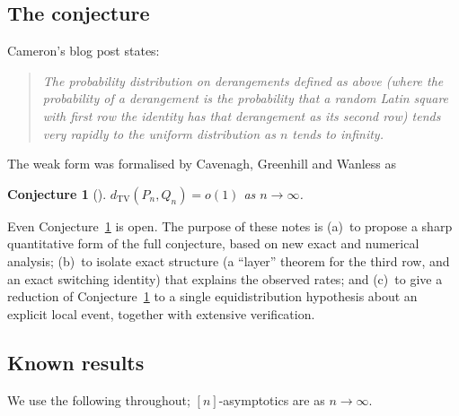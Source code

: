 \documentclass[11pt]{article}
\newtheorem{conjecture}[theorem]{Conjecture}
\theoremstyle{definition}
\newcommand{\dtv}{d_{\mathrm{TV}}}
\newcommand{\PP}{P}
\newcommand{\QQ}{Q}
\begin{document}
\subsection{The conjecture}

Cameron's blog post \cite{CamBlog15} states:

\begin{quote}\itshape
The probability distribution on derangements defined as above (where the
probability of a derangement is the probability that a random Latin square
with first row the identity has that derangement as its second row) tends
very rapidly to the uniform distribution as $n$ tends to infinity.
\end{quote}

The weak form was formalised by Cavenagh, Greenhill and Wanless as

\begin{conjecture}[{\cite[Conj.~6.1]{CGW08}}]\label{conj:cgw}
$\dtv(\PP_n,\QQ_n)=o(1)$ as $n\to\infty$.
\end{conjecture}

Even Conjecture~\ref{conj:cgw} is open.  The purpose of these notes is
(a)~to propose a sharp quantitative form of the full conjecture, based on new
exact and numerical analysis; (b)~to isolate exact structure (a
``layer'' theorem for the third row, and an exact switching identity) that
explains the observed rates; and (c)~to give a reduction of
Conjecture~\ref{conj:cgw} to a single equidistribution hypothesis about an
explicit local event, together with extensive verification.

\subsection{Known results}\label{sec:known}

We use the following throughout; $[n]$-asymptotics are as $n\to\infty$.
\end{document}
